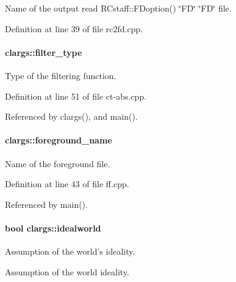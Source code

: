 Name of the output read RCstaff::FDoption() \char`\"{}FD\char`\"{} \char`\"{}FD\char`\"{} file. 



Definition at line 39 of file rc2fd.cpp.

\hypertarget{structclargs_ada865c8099ca2f31f421886e3ff8cc2b}{
\paragraph[{filter\_\-type}]{ {\bf clargs::filter\_\-type}}\hfill}
\label{structclargs_ada865c8099ca2f31f421886e3ff8cc2b}


Type of the filtering function. 



Definition at line 51 of file ct-\/abs.cpp.



Referenced by clargs(), and main().

\hypertarget{structclargs_ab68bba2b3fe0c92406d81829008a8365}{
\paragraph[{foreground\_\-name}]{ {\bf clargs::foreground\_\-name}}\hfill}
\label{structclargs_ab68bba2b3fe0c92406d81829008a8365}


Name of the foreground file. 



Definition at line 43 of file ff.cpp.



Referenced by main().

\hypertarget{structclargs_abbc893a8f8e9f79cf7f5edfd417ae68a}{
\paragraph[{idealworld}]{\setlength{\rightskip}{0pt plus 5cm}bool {\bf clargs::idealworld}}\hfill}
\label{structclargs_abbc893a8f8e9f79cf7f5edfd417ae68a}


Assumption of the world's ideality. 

Assumption of the world ideality. 

